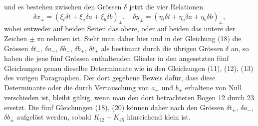 \documentclass[11pt,a4paper,leqno]{article}
\begin{document}
und es bestehen zwischen den Grössen $\delta$ jetzt die vier Relationen
\begin{equation}\tag{20}
\delta x_\pm=(\xi_t\delta t+\xi_a\delta a+\xi_b\delta b)_\pm,
\quad
\delta y_\pm=(\eta_t\delta t+\eta_a\delta a+\eta_b\delta b)_\pm,
\end{equation}
wobei entweder auf beiden Seiten das obere, oder auf beiden das untere der Zeichen $\pm$ zu nehmen ist. Sieht man daher hier und in der Gleichung (18) die Grössen $\delta t_-$, $\delta a_-$, $\delta b_-$, $\delta b_+$, $\delta t_+$ als bestimmt durch die übrigen Grössen $\delta$ an, so haben die jene fünf Grössen enthaltenden Glieder in den angesetzten fünf Gleichungen genau dieselbe Determinante wie in den Gleichungen (11), (12), (13) des vorigen Paragraphen. Der dort gegebene Beweis dafür, dass diese Determinante oder die durch Vertauschung von $a_+$ und $b_+$ erhaltene von Null verschieden ist, bleibt gültig, wenn man den dort betrachteten Bogen 12 durch 23 ersetzt. Die fünf Gleichungen (18), (20) können daher nach den Grössen $\delta t_\pm$, $\delta a_-$, $\delta b_\pm$ aufgelöst werden, sobald $K_{12}-K_{45}$ hinreichend klein ist.
\end{document}
